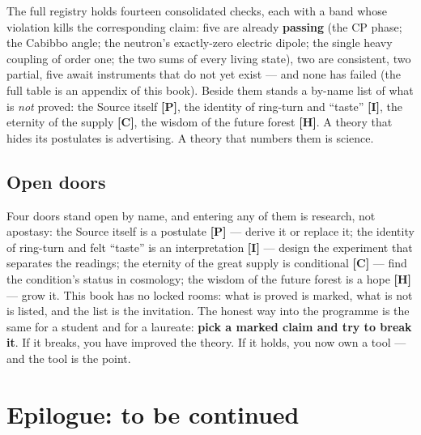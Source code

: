 \documentclass[11pt,letterpaper]{article}
\newcommand{\stC}{\textbf{[C]}\xspace}
\newcommand{\stP}{\textbf{[P]}\xspace}
\newcommand{\stI}{\textbf{[I]}\xspace}
\newcommand{\stH}{\textbf{[H]}\xspace}
\begin{document}
\begin{factbox}
The full registry holds fourteen consolidated checks, each with a
band whose violation kills the corresponding claim: five are
already \textbf{passing} (the CP phase; the Cabibbo angle; the
neutron's exactly-zero electric dipole; the single heavy coupling
of order one; the two sums of every living state), two are
consistent, two partial, five await instruments that do not yet
exist --- and none has failed (the full table is an appendix of
this book). Beside them stands a by-name list of what is \emph{not}
proved: the Source itself \stP, the identity of ring-turn and
``taste'' \stI, the eternity of the supply \stC, the wisdom of the
future forest \stH. A theory that hides its postulates is
advertising. A theory that numbers them is science.
\end{factbox}

\subsection*{Open doors}

Four doors stand open by name, and entering any of them is research,
not apostasy: the Source itself is a postulate \stP{} --- derive it
or replace it; the identity of ring-turn and felt ``taste'' is an
interpretation \stI{} --- design the experiment that separates the
readings; the eternity of the great supply is conditional \stC{} ---
find the condition's status in cosmology; the wisdom of the future
forest is a hope \stH{} --- grow it. This book has no locked rooms:
what is proved is marked, what is not is listed, and the list is the
invitation. The honest way into the programme is the same for a
student and for a laureate: \textbf{pick a marked claim and try to
break it}. If it breaks, you have improved the theory. If it holds,
you now own a tool --- and the tool is the point.


\section*{Epilogue: to be continued}
\end{document}
